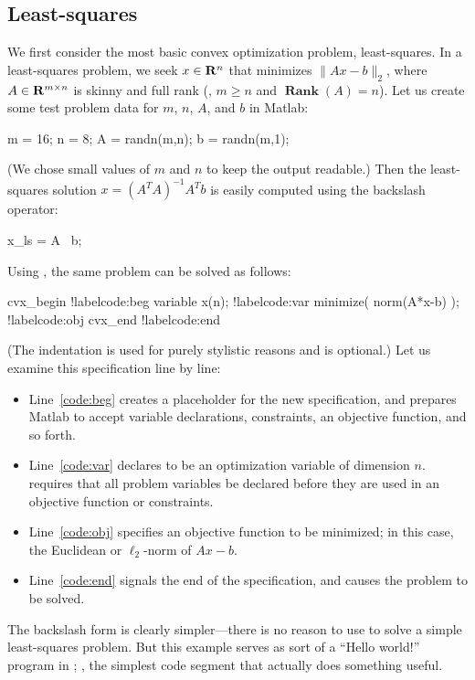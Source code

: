 \documentclass[12pt]{article}
\def\Rank{\operatorname*{\textbf{Rank}}}
\begin{document}
\subsection{Least-squares}
\label{sec:leastsquares}

We first consider the most basic convex optimization problem,
least-squares.
In a least-squares problem, we seek $x \in \R^n$
that minimizes $\|Ax-b\|_2$, where $A\in \R^{m \times n}$ is
skinny and full rank (\ie, $m\geq n$ and $\Rank (A)=n$).
Let us create some test problem data for $m$, $n$, $A$, and $b$ in Matlab:
\begin{code2}[firstnumber=15]
	m = 16; n = 8;
	A = randn(m,n);
	b = randn(m,1);
\end{code2}
(We chose small values of $m$ and $n$ to keep the output readable.)
Then the least-squares solution  $x=(A^TA)^{-1}A^Tb$ is easily
computed using the backslash operator: 
\begin{code2}[firstnumber=20]
	x_ls = A \ b;
\end{code2}
Using \cvx, the same problem can be solved as follows:
\begin{code2}[firstnumber=23]
	cvx_begin			!label{code:beg}
	    variable x(n);		!label{code:var}
	    minimize( norm(A*x-b) );	!label{code:obj}
	cvx_end				!label{code:end}
\end{code2}
(The indentation is used for purely stylistic reasons and is optional.) 
Let us examine this specification line by line:
\begin{itemize}
\item Line~\ref{code:beg} creates a placeholder for the
new \cvx specification, and prepares Matlab to accept 
variable declarations, constraints, an objective function, and so forth. 
\item Line~\ref{code:var} declares \verb@x@
to be an optimization variable of dimension $n$. \cvx
requires that all problem variables be declared before they are used in
an objective function or constraints. 
\item Line~\ref{code:obj}
specifies an objective function to be minimized; in this case,
the Euclidean or $\ell_2$-norm
of $Ax-b$. 
\item Line~\ref{code:end} signals the end of the \cvx specification,
and causes the problem to be solved.
\end{itemize}
The backslash form is clearly simpler---there is no reason to use \cvx
to solve a simple least-squares problem. But this
example serves as sort of a ``Hello world!'' program in \cvx;
\ie, the simplest code segment that actually does something useful.
\end{document}
